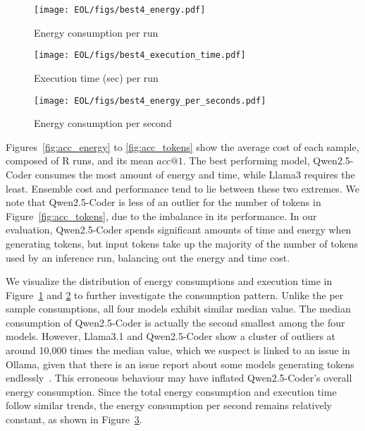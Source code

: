 
\begin{figure*}[ht]
\centering
\begin{subfigure}[t]{0.32\textwidth}
\texttt{[image: EOL/figs/best4\_energy.pdf]}
\caption{Energy consumption per run\label{fig:original_cost}}
\end{subfigure}
\begin{subfigure}[t]{0.32\textwidth}
\texttt{[image: EOL/figs/best4\_execution\_time.pdf]}
\caption{Execution time (sec) per run\label{fig:time_cost}}
\end{subfigure}
\begin{subfigure}[t]{0.32\textwidth}
\texttt{[image: EOL/figs/best4\_energy\_per\_seconds.pdf]}
\caption{Energy consumption per second\label{fig:watt_cost}}
\end{subfigure}
\caption{Boxplots of cost measures per model. Note that $y$-axis of (a) and (b) is log of the measure.}
\end{figure*}



Figures~\ref{fig:acc_energy} to \ref{fig:acc_tokens} show the average cost of each sample, composed of R runs, and its mean $acc@1$. The best performing model, Qwen2.5-Coder consumes the most amount of energy and time, while Llama3 requires the least. Ensemble cost and performance tend to lie between these two extremes. We note that Qwen2.5-Coder is less of an outlier for the number of tokens in Figure~\ref{fig:acc_tokens}, due to the imbalance in its performance. In our evaluation, Qwen2.5-Coder spends significant amounts of time and energy when generating tokens, but input tokens take up the majority of the number of tokens used by an inference run, balancing out the energy and time cost.

We visualize the distribution of energy consumptions and execution time in Figure~\ref{fig:original_cost} and \ref{fig:time_cost} to further investigate the consumption pattern. Unlike the per sample consumptions, all four models exhibit similar median value. The median consumption of Qwen2.5-Coder is actually the second smallest among the four models. However, Llama3.1 and Qwen2.5-Coder show a cluster of outliers at around 10,000 times the median value, which we suspect is linked to an issue in Ollama, given that there is an issue report about some models generating tokens endlessly~\cite{OllamaGetsStuck}. This erroneous behaviour may have inflated Qwen2.5-Coder's overall energy consumption. Since the total energy consumption and execution time follow similar trends, the energy consumption per second remains relatively constant, as shown in Figure~\ref{fig:watt_cost}.


